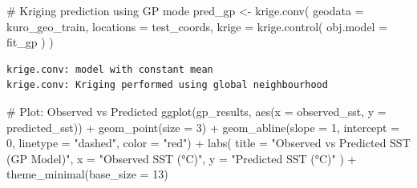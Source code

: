 \documentclass[
  11pt,
]{article}
\newenvironment{Shaded}{\begin{snugshade}}{\end{snugshade}}
\newcommand{\AttributeTok}[1]{\textcolor[rgb]{0.40,0.45,0.13}{#1}}
\newcommand{\CommentTok}[1]{\textcolor[rgb]{0.37,0.37,0.37}{#1}}
\newcommand{\DecValTok}[1]{\textcolor[rgb]{0.68,0.00,0.00}{#1}}
\newcommand{\FunctionTok}[1]{\textcolor[rgb]{0.28,0.35,0.67}{#1}}
\newcommand{\NormalTok}[1]{\textcolor[rgb]{0.00,0.23,0.31}{#1}}
\newcommand{\OtherTok}[1]{\textcolor[rgb]{0.00,0.23,0.31}{#1}}
\newcommand{\SpecialCharTok}[1]{\textcolor[rgb]{0.37,0.37,0.37}{#1}}
\newcommand{\StringTok}[1]{\textcolor[rgb]{0.13,0.47,0.30}{#1}}
\begin{document}
\begin{Shaded}
\begin{Highlighting}[]
\CommentTok{\# Kriging prediction using GP mode}
\NormalTok{pred\_gp }\OtherTok{\textless{}{-}} \FunctionTok{krige.conv}\NormalTok{(}
  \AttributeTok{geodata =}\NormalTok{ kuro\_geo\_train,}
  \AttributeTok{locations =}\NormalTok{ test\_coords,}
  \AttributeTok{krige =} \FunctionTok{krige.control}\NormalTok{(}
    \AttributeTok{obj.model =}\NormalTok{ fit\_gp}
\NormalTok{  )}
\NormalTok{)}
\end{Highlighting}
\end{Shaded}

\begin{verbatim}
krige.conv: model with constant mean
krige.conv: Kriging performed using global neighbourhood 
\end{verbatim}

\begin{Shaded}
\end{Shaded}

\begin{Shaded}
\begin{Highlighting}[]
\CommentTok{\# Plot: Observed vs Predicted}
\FunctionTok{ggplot}\NormalTok{(gp\_results, }\FunctionTok{aes}\NormalTok{(}\AttributeTok{x =}\NormalTok{ observed\_sst, }\AttributeTok{y =}\NormalTok{ predicted\_sst)) }\SpecialCharTok{+}
  \FunctionTok{geom\_point}\NormalTok{(}\AttributeTok{size =} \DecValTok{3}\NormalTok{) }\SpecialCharTok{+}
  \FunctionTok{geom\_abline}\NormalTok{(}\AttributeTok{slope =} \DecValTok{1}\NormalTok{, }\AttributeTok{intercept =} \DecValTok{0}\NormalTok{, }\AttributeTok{linetype =} \StringTok{"dashed"}\NormalTok{, }\AttributeTok{color =} \StringTok{"red"}\NormalTok{) }\SpecialCharTok{+}
  \FunctionTok{labs}\NormalTok{(}
    \AttributeTok{title =} \StringTok{"Observed vs Predicted SST (GP Model)"}\NormalTok{,}
    \AttributeTok{x =} \StringTok{"Observed SST (°C)"}\NormalTok{,}
    \AttributeTok{y =} \StringTok{"Predicted SST (°C)"}
\NormalTok{  ) }\SpecialCharTok{+}
  \FunctionTok{theme\_minimal}\NormalTok{(}\AttributeTok{base\_size =} \DecValTok{13}\NormalTok{)}
\end{Highlighting}
\end{Shaded}
\end{document}

